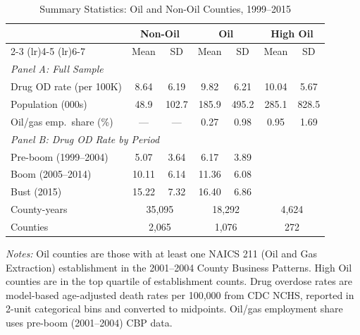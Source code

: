 \begin{table}[H]
\centering
\caption{Summary Statistics: Oil and Non-Oil Counties, 1999--2015}
\begin{threeparttable}
\begin{tabular}{lcccccc}
\toprule
 & \multicolumn{2}{c}{Non-Oil} & \multicolumn{2}{c}{Oil} & \multicolumn{2}{c}{High Oil} \\
 \cmidrule(lr){2-3} \cmidrule(lr){4-5} \cmidrule(lr){6-7}
 & Mean & SD & Mean & SD & Mean & SD \\
\midrule
\multicolumn{7}{l}{\textit{Panel A: Full Sample}} \\
Drug OD rate (per 100K) & 8.64 & 6.19 & 9.82 & 6.21 & 10.04 & 5.67 \\
Population (000s) & 48.9 & 102.7 & 185.9 & 495.2 & 285.1 & 828.5 \\
Oil/gas emp.~share (\%) & --- & --- & 0.27 & 0.98 & 0.95 & 1.69 \\
\midrule
\multicolumn{7}{l}{\textit{Panel B: Drug OD Rate by Period}} \\
Pre-boom (1999--2004) & 5.07 & 3.64 & 6.17 & 3.89 & & \\
Boom (2005--2014) & 10.11 & 6.14 & 11.36 & 6.08 & & \\
Bust (2015) & 15.22 & 7.32 & 16.40 & 6.86 & & \\
\midrule
County-years & \multicolumn{2}{c}{35,095} & \multicolumn{2}{c}{18,292} & \multicolumn{2}{c}{4,624} \\
Counties & \multicolumn{2}{c}{2,065} & \multicolumn{2}{c}{1,076} & \multicolumn{2}{c}{272} \\
\bottomrule
\end{tabular}
\begin{tablenotes}[flushleft]
\small
\item \textit{Notes:} Oil counties are those with at least one NAICS 211 (Oil and Gas Extraction) establishment in the 2001--2004 County Business Patterns. High Oil counties are in the top quartile of establishment counts. Drug overdose rates are model-based age-adjusted death rates per 100,000 from CDC NCHS, reported in 2-unit categorical bins and converted to midpoints. Oil/gas employment share uses pre-boom (2001--2004) CBP data.
\end{tablenotes}
\end{threeparttable}
\label{tab:summary}
\end{table}
